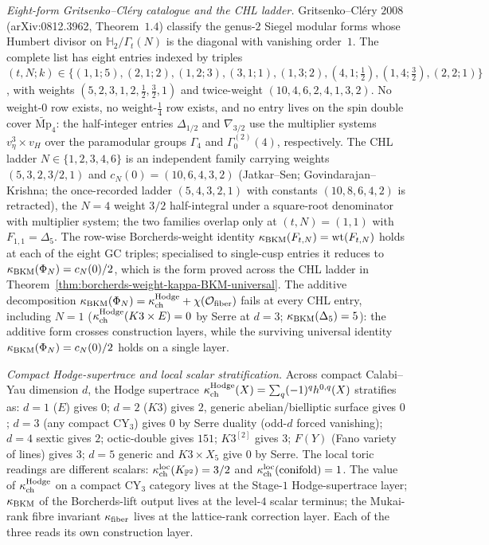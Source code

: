 \textsl{Eight-form Gritsenko--Cl\'ery catalogue and the CHL ladder.}\enspace
Gritsenko--Cl\'ery $2008$ (arXiv:0812.3962, Theorem~$1.4$) classify the
genus-$2$ Siegel modular forms whose Humbert divisor on
$\mathbb{H}_2/\Gamma_t(N)$ is the diagonal with vanishing order~$1$.
The complete list has eight entries indexed by triples
$(t, N; k) \in \{(1,1;5),(2,1;2),(1,2;3),(3,1;1),(1,3;2),
(4,1;\tfrac12),(1,4;\tfrac32),(2,2;1)\}$, with weights
$(5, 2, 3, 1, 2, \tfrac12, \tfrac32, 1)$ and twice-weight
$(10, 4, 6, 2, 4, 1, 3, 2)$. No weight-$0$ row exists, no
weight-$\tfrac14$ row exists, and no entry lives on the spin
double cover $\widetilde{\mathrm{Mp}}_4$: the half-integer entries
$\Delta_{1/2}$ and $\nabla_{3/2}$ use the multiplier systems
$v_\eta^3 \times v_H$ over the paramodular groups
$\Gamma_4$ and $\Gamma_0^{(2)}(4)$, respectively. The CHL ladder
$N \in \{1, 2, 3, 4, 6\}$ is an independent family carrying weights
$(5, 3, 2, 3/2, 1)$ and $c_N(0) = (10, 6, 4, 3, 2)$ (Jatkar--Sen;
Govindarajan--Krishna; the once-recorded ladder $(5, 4, 3, 2, 1)$ with
constants $(10, 8, 6, 4, 2)$ is retracted), the $N = 4$ weight $3/2$
half-integral under a square-root denominator with multiplier system;
the two families
overlap only at $(t, N) = (1, 1)$ with $F_{1,1} = \Delta_5$. The
row-wise Borcherds-weight identity
\(\kappa_{\mathrm{BKM}}(F_{t,N}) = \mathrm{wt}(F_{t,N})\) holds at each of the eight
GC triples; specialised to single-cusp entries it reduces to
\(\kappa_{\mathrm{BKM}}(\Phi_N) = c_N(0)/2\), which is the form proved across the CHL ladder
in Theorem~\ref{thm:borcherds-weight-kappa-BKM-universal}. The
additive decomposition
\(\kappa_{\mathrm{BKM}}(\Phi_N) = \kappa_{\mathrm{ch}}^{\mathrm{Hodge}} + \chi(\mathcal{O}_{\mathrm{fiber}})\)
fails at every CHL
entry, including \(N=1\) (\(\kappa_{\mathrm{ch}}^{\mathrm{Hodge}}(K3\times E) = 0\)
by Serre at \(d=3\); \(\kappa_{\mathrm{BKM}}(\Delta_5)=5\)): the additive form
crosses construction layers, while the surviving universal identity
\(\kappa_{\mathrm{BKM}}(\Phi_N) = c_N(0)/2\) holds on a single layer.

\textsl{Compact Hodge-supertrace and local scalar stratification.}\enspace
Across compact Calabi--Yau dimension \(d\), the Hodge supertrace
\(\kappa_{\mathrm{ch}}^{\mathrm{Hodge}}(X) = \sum_q (-1)^q h^{0,q}(X)\) stratifies as:
\(d=1\) (\(E\)) gives \(0\); \(d=2\) (\(K3\)) gives \(2\), generic
abelian/bielliptic surface gives \(0\); \(d=3\) (any compact CY$_3$)
gives \(0\) by Serre duality (odd-\(d\) forced vanishing); \(d=4\)
sextic gives \(2\); octic-double gives \(151\); \(K3^{[2]}\) gives
\(3\); \(F(Y)\) (Fano variety of lines) gives \(3\); \(d=5\)
generic and \(K3\times X_5\) give \(0\) by Serre. The local toric
readings are different scalars: \(\kappa_{\mathrm{ch}}^{\mathrm{loc}}(K_{\mathbb P^2})=3/2\)
and \(\kappa_{\mathrm{ch}}^{\mathrm{loc}}(\mathrm{conifold})=1\). The value of
$\kappa_{\mathrm{ch}}^{\mathrm{Hodge}}$ on a compact CY$_3$ category lives at the
Stage-$1$ Hodge-supertrace layer; $\kappa_{\mathrm{BKM}}$ of the Borcherds-lift
output lives at the level-$4$ scalar terminus; the Mukai-rank fibre
invariant $\kappa_{\mathrm{fiber}}$ lives at the lattice-rank correction layer. Each
of the three reads its own construction layer.

